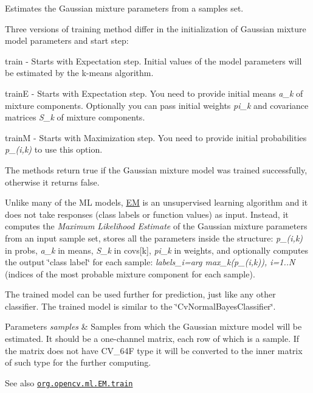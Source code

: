Estimates the Gaussian mixture parameters from a samples set.

Three versions of training method differ in the initialization of Gaussian mixture model parameters and start step\+:


\begin{DoxyItemize}
\item train -\/ Starts with Expectation step. Initial values of the model parameters will be estimated by the k-\/means algorithm. 
\item trainE -\/ Starts with Expectation step. You need to provide initial means {\itshape a\+\_\+k} of mixture components. Optionally you can pass initial weights {\itshape pi\+\_\+k} and covariance matrices {\itshape S\+\_\+k} of mixture components. 
\item trainM -\/ Starts with Maximization step. You need to provide initial probabilities {\itshape p\+\_\+(i,k)} to use this option. 
\end{DoxyItemize}

The methods return {\ttfamily true} if the Gaussian mixture model was trained successfully, otherwise it returns {\ttfamily false}.

Unlike many of the ML models, \mbox{\hyperlink{classorg_1_1opencv_1_1ml_1_1_e_m}{EM}} is an unsupervised learning algorithm and it does not take responses (class labels or function values) as input. Instead, it computes the {\itshape Maximum Likelihood Estimate} of the Gaussian mixture parameters from an input sample set, stores all the parameters inside the structure\+: {\itshape p\+\_\+(i,k)} in {\ttfamily probs}, {\itshape a\+\_\+k} in {\ttfamily means}, {\itshape S\+\_\+k} in {\ttfamily covs\mbox{[}k\mbox{]}}, {\itshape pi\+\_\+k} in {\ttfamily weights}, and optionally computes the output \char`\"{}class label\char`\"{} for each sample\+: {\itshape labels\+\_\+i=arg max\+\_\+k(p\+\_\+(i,k)), i=1..N} (indices of the most probable mixture component for each sample).

The trained model can be used further for prediction, just like any other classifier. The trained model is similar to the \char`\"{}\+Cv\+Normal\+Bayes\+Classifier\char`\"{}.


\begin{DoxyParams}{Parameters}
{\em samples} & Samples from which the Gaussian mixture model will be estimated. It should be a one-\/channel matrix, each row of which is a sample. If the matrix does not have {\ttfamily C\+V\+\_\+64F} type it will be converted to the inner matrix of such type for the further computing.\\
\hline
\end{DoxyParams}
\begin{DoxySeeAlso}{See also}
\href{http://docs.opencv.org/modules/ml/doc/expectation_maximization.html#em-train}{\tt org.\+opencv.\+ml.\+E\+M.\+train} 
\end{DoxySeeAlso}
\mbox{\label{classorg_1_1opencv_1_1ml_1_1_e_m_a4fce629628dd0081269518d604fe2bfd}} 
